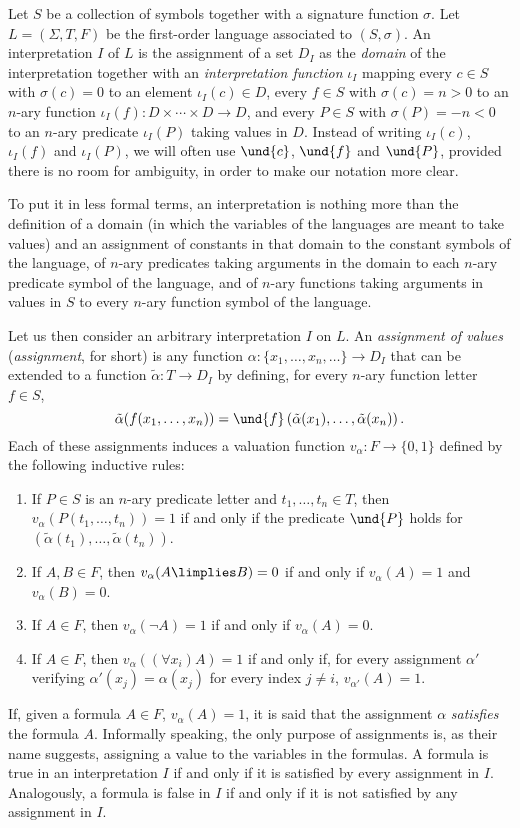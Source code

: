\begin{definition}
Let $S$ be a collection of symbols together with a signature function $\sigma$.
Let $L = (\Sigma, T, F)$ be the first-order language associated to $(S,\sigma)$.
An interpretation $I$ of $L$ is the assignment of a set $D_I$ as the \emph{domain} of the interpretation together with an \emph{interpretation function} $\iota_I$ mapping every $c\in S$ with $\sigma(c) = 0$ to an element $\iota_I(c) \in D$, every $f\in S$ with $\sigma(c) = n > 0$ to an $n$-ary function $\iota_I(f):D\times\cdots\times D \longrightarrow D$, and every $P \in S $ with $\sigma(P) = -n < 0$ to an $n$-ary predicate $\iota_I(P)$ taking values in $D$.
Instead of writing $\iota_I(c)$, $\iota_I(f)$ and $\iota_I(P)$, we will often use $\und{c}$, $\und{f}$ and $\und{P}$, provided there is no room for ambiguity, in order to make our notation more clear.

To put it in less formal terms, an interpretation is nothing more than the definition of a domain (in which the variables of the languages are meant to take values) and an assignment of constants in that domain to the constant symbols of the language, of $n$-ary predicates taking arguments in the domain to each $n$-ary predicate symbol of the language, and of $n$-ary functions taking arguments in values in $S$ to every $n$-ary function symbol of the language.

Let us then consider an arbitrary interpretation $I$ on $L$. An \emph{assignment of values} (\emph{assignment}, for short)  is any function $\alpha : \{x_1,\ldots, x_n,\ldots\} \longrightarrow D_I$ that can be extended to a function $\tilde{\alpha}:T\longrightarrow D_I$ by defining, for every $n$-ary function letter $f\in S$,
\[\tilde{\alpha}(f(x_1,\ldots,x_n)) = \und{f}\left( \tilde{\alpha}(x_1),\ldots,\tilde{\alpha}(x_n) \right). \]
Each of these assignments induces a valuation function $v_\alpha:F\longrightarrow\{0,1\}$ defined by the following inductive rules:
\begin{enumerate}
\item If $P\in S$ is an $n$-ary predicate letter and $t_1,\ldots,t_n \in T$, then $v_\alpha(P(t_1,\ldots,t_n)) = 1$ if and only if the predicate $\und{P}$ holds for $(\tilde{\alpha}(t_1),\ldots,\tilde{\alpha}(t_n))$.
\item If $A,B\in F$, then $v_\alpha(A\limplies B) = 0$ if and only if $v_\alpha(A) = 1$ and $v_\alpha(B) = 0$.
\item If $A \in F$, then $v_\alpha(\lnot A) = 1$ if and only if $v_\alpha(A) = 0$.
\item If $A\in F$, then $v_\alpha((\forall x_i) A) = 1$ if and only if, for every assignment $\alpha'$ verifying $\alpha'(x_j) = \alpha(x_j)$ for every index $j\neq i$, $v_{\alpha'}(A) = 1$.
\end{enumerate}
If, given a formula $A\in F$, $v_\alpha(A) = 1$, it is said that the assignment $\alpha$ \emph{satisfies} the formula $A$.
Informally speaking, the only purpose of assignments is, as their name suggests, assigning a value to the variables in the formulas.
A formula is true in an interpretation $I$ if and only if it is satisfied by every assignment in $I$.
Analogously, a formula is false in $I$ if and only if it is not satisfied by any assignment in $I$. 


\end{definition}
